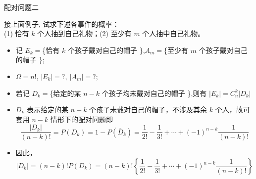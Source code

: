 \begin{frame}{配对问题二}
	\begin{exam}
		接上面例子, 试求下述各事件的概率：\\
		(1) 恰有 $k$ 个人抽到自己礼物；(2) 至少有 $m$ 个人抽中自己礼物。
	\end{exam}
	\pause
	\begin{itemize}[<+-|alert@+>]
		\item 记 $E_k=$\{恰有 $k$ 个孩子戴对自己的帽子 \},$A_m=$\{至少有 $m$ 个孩子戴对自己的帽子 \};
		\item $\Omega=n!$, \pause $|E_k|=?,\  |A_m|=?$;
		\item 若记 $D_k=$\{给定的某 $n-k$ 个孩子均未戴对自己的帽子 \},\pause 则有 $|E_k|=C_n^k|D_k|$
		\item $D_k$ 表示给定的某 $n-k$ 个孩子未戴对自己的帽子，不涉及其余 $k$ 个人，故可套用 $n-k$ 情形下的配对问题即 %
		      $$\dfrac{|D_k|}{(n-k)!}=P(D_k)=1-P(\overline{D}_k)=\frac{1}{2!}-\frac{1}{3!}+\cdots+(-1)^{n-k}\frac{1}{(n-k)!}$$
		\item 因此，$$|D_k|=(n-k)!P (D_k)=(n-k)!\left\{\frac{1}{2!}-\frac{1}{3!}+\cdots+(-1)^{n-k}\frac{1}{(n-k)!}\right\}$$
	\end{itemize}

\end{frame}


